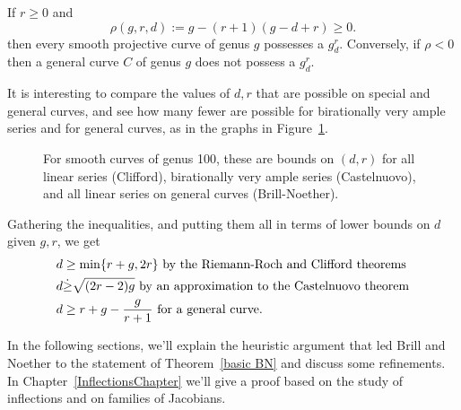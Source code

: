 \begin{theorem}\label{basic BN}
If $r\geq 0$ and
 $$
 \rho(g,r,d) := g - (r+1)(g-d+r) \geq 0.
$$
then every smooth projective curve of genus $g$  possesses a $g^r_d$. Conversely, if $\rho < 0$ then a general curve $C$ of genus $g$ does not possess a $g^r_d$.
\end{theorem}


It is interesting to compare the values of $d,r$ that are possible on special and general curves, and see how many fewer are possible for birationally very ample series and for general curves, as in the graphs in 
Figure~\ref{Clifford-Castelnuovo-BrillNoether comparison}.

\begin{figure}
\begin{center}
\caption{For smooth curves of genus 100, 
these are bounds on $(d,r)$ for all linear series (Clifford), 
birationally very ample series (Castelnuovo), and all linear series
on general curves (Brill-Noether). }
\label{Clifford-Castelnuovo-BrillNoether comparison}
\end{center}
\end{figure}


Gathering the inequalities, and putting them all in terms of lower bounds on $d$ given $g, r$,
we get \goodbreak
\begin{align*}
 d &\geq \min\{r+g, 2r\} \hbox{ by the Riemann-Roch and Clifford theorems}\\
 d &\dot\geq \sqrt{(2r-2)g} \hbox{ by an approximation to the Castelnuovo theorem}\\
 d &\geq r+g-\frac{g}{r+1} \hbox{ for a general curve.}
\end{align*}

In the following sections, we'll explain the heuristic argument that led Brill and Noether to the statement of Theorem~\ref{basic BN} and discuss some refinements.   In Chapter~\ref{InflectionsChapter} we'll give a proof based on the study
of inflections and on families of Jacobians.%

